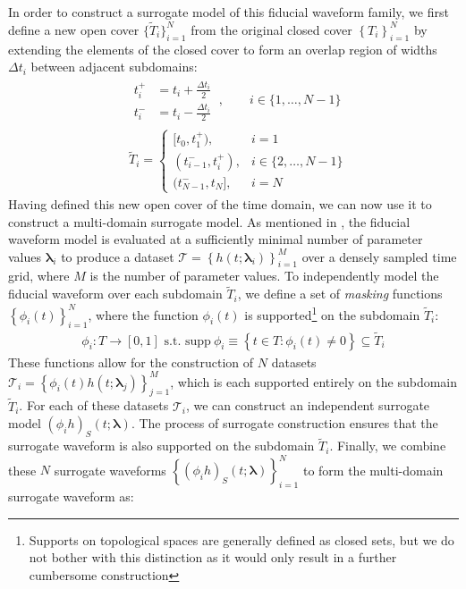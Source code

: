 \documentclass[aps,prd,amsmath,floats,floatfix, twocolumn,
superscriptaddress,nofootinbib,showpacs,longbibliography]{revtex4-1}
\begin{document}
In order to construct a surrogate model of this fiducial waveform family, we first define a new open cover $\{\tilde{T}_i\}_{i=1}^{N}$ from the original closed cover $\left\{T_i\right\}_{i=1}^{N}$ by extending the elements of the closed cover to form an overlap region of widths $\Delta t_i$ between adjacent subdomains:
\begin{align}
    &\begin{aligned}
        t_i^+ &= t_i + \frac{\Delta t_i}{2}\\
        t_i^- &= t_i - \frac{\Delta t_i}{2}
    \end{aligned}\ ,
    \qquad i\in\{1,\ldots,N-1\}\\
    &\tilde{T}_i = \begin{cases}
        [t_0, t_1^+), & i=1\\
        (t_{i-1}^-, t_{i}^+), & i\in\{2,\ldots,N-1\}\\
        (t_{N-1}^-, t_N], & i=N
    \end{cases}
\end{align}
Having defined this new open cover of the time domain, we can now use it to construct a multi-domain surrogate model. As mentioned in \cite{Field:2013cfa}, the fiducial waveform model is evaluated at a sufficiently minimal number of parameter values $\bm{\lambda}_i$ to produce a dataset $\mathcal{T}=\left\{h(t;\bm{\lambda}_i)\right\}_{i=1}^{M}$ over a densely sampled time grid, where $M$ is the number of parameter values. To independently model the fiducial waveform over each subdomain $\tilde{T}_i$, we define a set of \textit{masking} functions $\left\{\phi_i(t)\right\}_{i=1}^{N}$, where the function $\phi_i(t)$ is supported\footnote{Supports on topological spaces are generally defined as closed sets, but we do not bother with this distinction as it would only result in a further cumbersome construction} on the subdomain $\tilde{T}_i$:
\begin{multline*}
    \phi_i :T\rightarrow [0,1]\text{ s.t. }\text{supp}\ \phi_i \equiv \left\{t\in T : \phi_i (t)\neq 0\right\}\subseteq \tilde{T}_i
\end{multline*}
These functions allow for the construction of $N$ datasets $\mathcal{T}_i=\left\{\phi_i(t)h(t;\bm{\lambda}_j)\right\}_{j=1}^{M}$, which is each supported entirely on the subdomain $\tilde{T}_i$. For each of these datasets $\mathcal{T}_i$, we can construct an independent surrogate model $(\phi_i h)_S(t;\bm{\lambda})$. The process of surrogate construction ensures that the surrogate waveform is also supported on the subdomain $\tilde{T}_i$. Finally, we combine these $N$ surrogate waveforms $\left\{(\phi_i h)_S(t;\bm{\lambda})\right\}_{i=1}^{N}$ to form the multi-domain surrogate waveform as:
\end{document}
